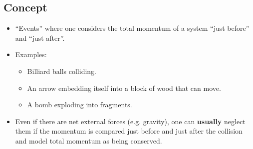 \documentclass[aspectratio=169,
hyperref={colorlinks,urlcolor=blue}
]{beamer}
\begin{document}
\subsection{Concept}
\label{subsec:collisionconcept}
{
\begin{itemize}
\item ``Events'' where one considers the total momentum of a system ``just before'' and ``just after''.
\item Examples:
\begin{itemize}
\item Billiard balls colliding.
\item An arrow embedding itself into a block of wood that can move.
\item A bomb exploding into fragments.
\end{itemize}
\item Even if there are net external forces (e.g. gravity), one can \textbf{usually} neglect them if the momentum is compared just before and just after the collision and model total momentum as being conserved.
\end{itemize}
}
\end{document}
